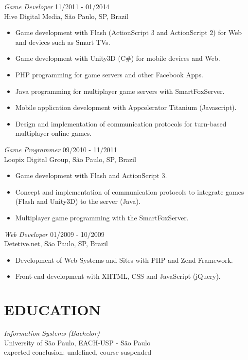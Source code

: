 \documentclass[line,margin]{res}
\begin{document}
\begin{resume}
				{\sl Game Developer} \hfill 11/2011 - 01/2014 \\
                Hive Digital Media, São Paulo, SP, Brazil
                 \begin{itemize}  \itemsep 1.25pt
                 \item Game development with Flash (ActionScript 3 and ActionScript 2) for Web and devices such as Smart TVs.
		 		 \item Game development with Unity3D (C\#) for mobile devices and Web.
                 \item PHP programming for game servers and other Facebook Apps.
                 \item Java programming for multiplayer game servers with SmartFoxServer.
		 		 \item Mobile application development with Appcelerator Titanium (Javascript).
                 \item Design and implementation of communication protocols for turn-based multiplayer online games.
                 \end{itemize}
                 
                {\sl Game Programmer} \hfill 09/2010 - 11/2011 \\
                Loopix Digital Group, São Paulo, SP, Brazil
                 \begin{itemize}  \itemsep 1.25pt
                 \item Game development with Flash and ActionScript 3.
                 \item Concept and implementation of communication protocols to integrate games (Flash and Unity3D) to the server (Java).
                 \item Multiplayer game programming with the SmartFoxServer.
                 \end{itemize}
 
                {\sl Web Developer} \hfill 01/2009 - 10/2009 \\
                Detetive.net, São Paulo, SP, Brazil
                 \begin{itemize}  \itemsep 1.25pt
                 \item Development of Web Systems and Sites with PHP and Zend Framework.
                 \item Front-end development with XHTML, CSS and JavaScript (jQuery).
                 \end{itemize} 

\section{EDUCATION} {\sl Information Systems (Bachelor)} \\
                University of São Paulo, EACH-USP - São Paulo \\
                expected conclusion: undefined, course suspended
		

\end{resume}
\end{document}
